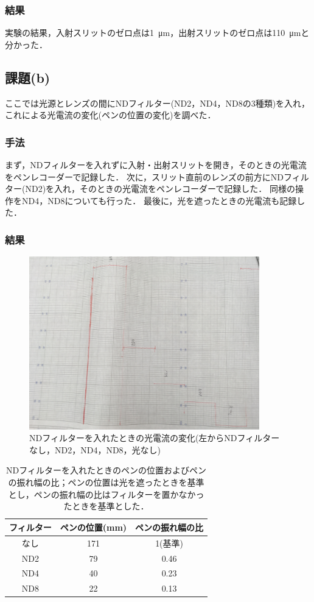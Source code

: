 \documentclass[titlepage]{jsarticle}
\begin{document}
\subsubsection{結果}
実験の結果，入射スリットのゼロ点は\SI{1}{\um}，出射スリットのゼロ点は\SI{110}{\um}と分かった．

\subsection{課題(b)}
ここでは光源とレンズの間にNDフィルター(ND2，ND4，ND8の3種類)を入れ，これによる光電流の変化(ペンの位置の変化)を調べた．

\subsubsection{手法}
まず，NDフィルターを入れずに入射・出射スリットを開き，そのときの光電流をペンレコーダーで記録した．
次に，スリット直前のレンズの前方にNDフィルター(ND2)を入れ，そのときの光電流をペンレコーダーで記録した．
同様の操作をND4，ND8についても行った．
最後に，光を遮ったときの光電流も記録した．

\subsubsection{結果}
\begin{figure}[htbp]
  \centering
  \includegraphics[width=10cm]{b_ND.JPG}
  \caption{NDフィルターを入れたときの光電流の変化(左からNDフィルターなし，ND2，ND4，ND8，光なし)}
  \label{fig:ND}
\end{figure}

\begin{table}[htbp]
  \centering
  \caption{NDフィルターを入れたときのペンの位置およびペンの振れ幅の比；ペンの位置は光を遮ったときを基準とし，ペンの振れ幅の比はフィルターを置かなかったときを基準とした．}
  \label{tab:ND}
  \begin{tabular}{c|cc}
    フィルター & ペンの位置(mm) & ペンの振れ幅の比 \\
    \hline\hline
    なし & 171 & 1(基準) \\
    ND2 & 79 & 0.46 \\
    ND4 & 40 & 0.23\\
    ND8 & 22 & 0.13\\
    \hline
  \end{tabular}
\end{table}
\end{document}
